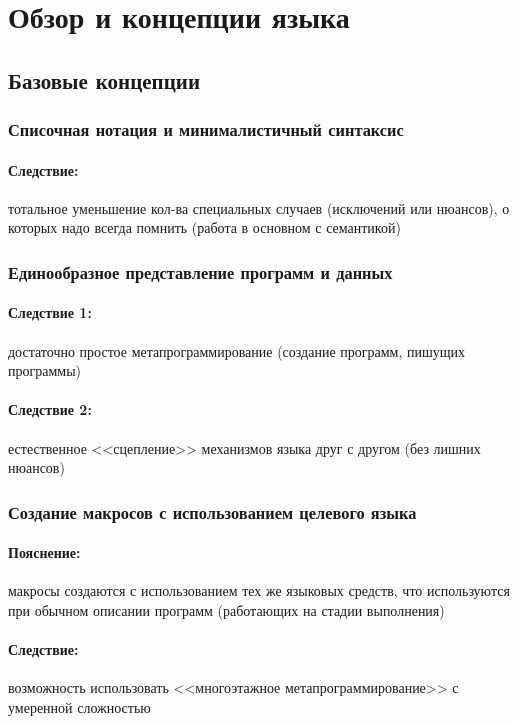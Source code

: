 \section{Обзор и концепции языка}\label{common-lisp:introduction:review}
\subsection{Базовые концепции}\label{common-lisp:introduction:review:base}
\subsubsection{Списочная нотация и минималистичный синтаксис}
\paragraph{Следствие:} тотальное уменьшение кол-ва специальных случаев (исключений или нюансов), о которых надо всегда помнить (работа в основном с семантикой)
\subsubsection{Единообразное представление программ и данных}
\paragraph{Следствие 1:} достаточно простое метапрограммирование (создание программ, пишущих программы)
\paragraph{Следствие 2:} естественное <<сцепление>> механизмов языка друг с другом (без лишних нюансов)
\subsubsection{Создание макросов с использованием целевого языка}
\paragraph{Пояснение:} макросы создаются с использованием тех же языковых средств, что используются при обычном описании программ (работающих на стадии выполнения)
\paragraph{Следствие:} возможность использовать <<многоэтажное метапрограммирование>> с умеренной сложностью

